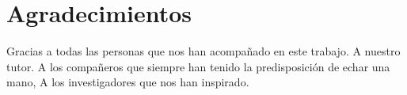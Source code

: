 
\chapter*{Agradecimientos}

Gracias a todas las personas que nos han acompañado en este trabajo. A nuestro tutor. A los compañeros que siempre han tenido la predisposición de echar una mano,
A los investigadores que nos han inspirado. 